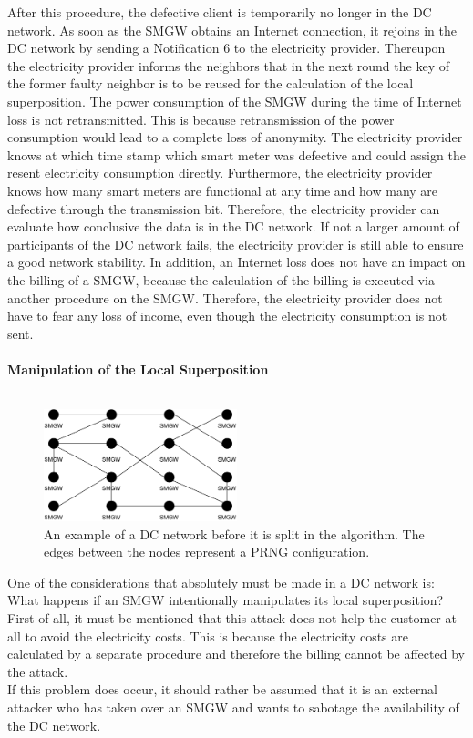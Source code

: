 After this procedure, the defective client is temporarily no longer in the DC network. As soon as the \gls{SMGW} obtains an Internet connection, it rejoins in the DC network by sending a Notification 6 to the electricity provider. Thereupon the electricity provider informs the neighbors that in the next round the key of the former faulty neighbor is to be reused for the calculation of the local superposition. The power consumption of the \gls{SMGW} during the time of Internet loss is not retransmitted. This is because retransmission of the power consumption would lead to a complete loss of anonymity. The electricity provider knows at which time stamp which smart meter was defective and could assign the resent electricity consumption directly. Furthermore, the electricity provider knows how many smart meters are functional at any time and how many are defective through the transmission bit. Therefore, the electricity provider can evaluate how conclusive the data is in the DC network. %
If not a larger amount of participants of the DC network fails, the electricity provider is still able to ensure a good network stability. %
In addition, an Internet loss does not have an impact on the billing of a \gls{SMGW}, because the calculation of the billing is executed via another procedure on the \gls{SMGW}. Therefore, the electricity provider does not have to fear any loss of income, even though the electricity consumption is not sent.\\
\\ 
\textbf{Manipulation of the Local Superposition}
\label{subsec:mani_local}
\\
\\
\begin{figure}[tbp]
  \centering
  \includegraphics[width=0.5\textwidth]{images/DC Net before Split2.png}
  \caption[Example DC Network]{An example of a DC network before it is split in the algorithm. The edges between the nodes represent a \gls{PRNG} configuration.}
  \label{fig:splitDCNetwork}
\end{figure}One of the considerations that absolutely must be made in a DC network is: What happens if an \gls{SMGW} intentionally manipulates its local superposition? First of all, it must be mentioned that this attack does not help the customer at all to avoid the electricity costs. This is because the electricity costs are calculated by a separate procedure and therefore the billing cannot be affected by the attack.\\ If this problem does occur, it should rather be assumed that it is an external attacker who has taken over an \gls{SMGW} and wants to sabotage the availability of the DC network.
